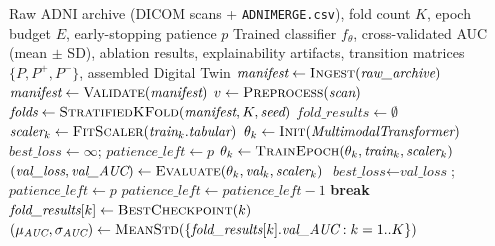 \documentclass[pdflatex,sn-mathphys-num]{sn-jnl}%
\theoremstyle{thmstyleone}%
\theoremstyle{thmstyletwo}%
\theoremstyle{thmstylethree}%
\begin{document}
\begin{algorithm}
\caption{End-to-End BDT Training and Evaluation Pipeline}\label{algo1}
\footnotesize
\begin{algorithmic}[1]
\Require Raw ADNI archive (DICOM scans + \texttt{ADNIMERGE.csv}), fold count $K$, epoch budget $E$, early-stopping patience $p$
\Ensure Trained classifier $f_\theta$, cross-validated AUC (mean $\pm$ SD), ablation results, explainability artifacts, transition matrices $\{P, P^+, P^-\}$, assembled Digital Twin
\State $\textit{manifest} \gets \Call{Ingest}{\textit{raw\_archive}}$ 
\State $\textit{manifest} \gets \Call{Validate}{\textit{manifest}}$ 
    \State $v \gets \Call{Preprocess}{\textit{scan}}$ 
    \State {} 
\EndFor
\State $\textit{folds} \gets \Call{StratifiedKFold}{\textit{manifest}, K, \textit{seed}}$ 
\State $\textit{fold\_results} \gets \emptyset$
    \State $\textit{scaler}_k \gets \Call{FitScaler}{\textit{train}_k.\textit{tabular}}$ 
    \State $\theta_k \gets \Call{Init}{\textit{MultimodalTransformer}}$
    \State $\textit{best\_loss} \gets \infty$; $\textit{patience\_left} \gets p$
        \State $\theta_k \gets \Call{TrainEpoch}{\theta_k, \textit{train}_k, \textit{scaler}_k}$ 
        \State $(\textit{val\_loss}, \textit{val\_AUC}) \gets \Call{Evaluate}{\theta_k, \textit{val}_k, \textit{scaler}_k}$
            \State $\textit{best\_loss} \gets \textit{val\_loss}$; $\textit{patience\_left} \gets p$
            \State {}
        \Else
            \State $\textit{patience\_left} \gets \textit{patience\_left} - 1$
                \State \textbf{break} 
            \EndIf
        \EndIf
    \EndFor
    \State $\textit{fold\_results}[k] \gets \Call{BestCheckpoint}{k}$
\EndFor
\State $(\mu_{\textit{AUC}}, \sigma_{\textit{AUC}}) \gets \Call{MeanStd}{\{\textit{fold\_results}[k].\textit{val\_AUC} : k = 1..K\}}$

\end{algorithmic}
\end{algorithm}
\end{document}
